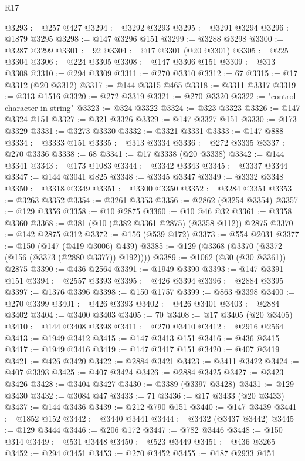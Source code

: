 \begin{lexlean}{R17}
\begin{coremodule}
@3293 := @257 @427
@3294 := @3292 @3293
@3295 := @3291 @3294
@3296 := @1879 @3295
@3298 := @147 @3296 @151
@3299 := @3288 @3298
@3300 := @3287 @3299
@3301 := 92
@3304 := @17 @3301 (@20 @3301)
@3305 := @225 @3304
@3306 := @224 @3305
@3308 := @147 @3306 @151
@3309 := @313 @3308
@3310 := @294 @3309
@3311 := @270 @3310
@3312 := 67
@3315 := @17 @3312 (@20 @3312)
@3317 := @144 @3315 @465
@3318 := @3311 @3317
@3319 := @313 @1516
@3320 := @272 @3319
@3321 := @270 @3320
@3322 := "control character in string"
@3323 := @324 @3322
@3324 := @323 @3323
@3326 := @147 @3324 @151
@3327 := @321 @3326
@3329 := @147 @3327 @151
@3330 := @173 @3329
@3331 := @3273 @3330
@3332 := @3321 @3331
@3333 := @147 @888
@3334 := @3333 @151
@3335 := @313 @3334
@3336 := @272 @3335
@3337 := @270 @3336
@3338 := 68
@3341 := @17 @3338 (@20 @3338)
@3342 := @144 @3341
@3343 := @173 @1083
@3344 := @3342 @3343
@3345 := @3337 @3344
@3347 := @144 @3041 @825
@3348 := @3345 @3347
@3349 := @3332 @3348
@3350 := @3318 @3349
@3351 := @3300 @3350
@3352 := @3284 @3351
@3353 := @3263 @3352
@3354 := @3261 @3353
@3356 := @2862 (@3254 @3354)
@3357 := @129 @3356
@3358 := @10 @2875
@3360 := @10 @46 @32
@3361 := @3358 @3360
@3368 := @381 (@10 (@382 @3361 @2875) (@3358 @112)) @2875
@3370 := @142 @2875 @312
@3372 := @156 (@539 @172)
@3373 := @554 @2031
@3377 := @150 (@147 (@419 @3006) @439)
@3385 := @129 (@3368 (@3370 (@3372 (@156 (@3373 (@2880 @3377)) @192))))
@3389 := @1062 (@30 (@30 @3361)) @2875
@3390 := @436 @2564
@3391 := @1949 @3390
@3393 := @147 @3391 @151
@3394 := @2557 @3393
@3395 := @426 @3394
@3396 := @2884 @3395
@3397 := @1376 @3396
@3398 := @150 @1757
@3399 := @863 @3398
@3400 := @270 @3399
@3401 := @426 @3393
@3402 := @426 @3401
@3403 := @2884 @3402
@3404 := @3400 @3403
@3405 := 70
@3408 := @17 @3405 (@20 @3405)
@3410 := @144 @3408 @3398
@3411 := @270 @3410
@3412 := @2916 @2564
@3413 := @1949 @3412
@3415 := @147 @3413 @151
@3416 := @436 @3415
@3417 := @1949 @3416
@3419 := @147 @3417 @151
@3420 := @407 @3419
@3421 := @426 @3420
@3422 := @2884 @3421
@3423 := @3411 @3422
@3424 := @407 @3393
@3425 := @407 @3424
@3426 := @2884 @3425
@3427 := @3423 @3426
@3428 := @3404 @3427
@3430 := @3389 (@3397 @3428)
@3431 := @129 @3430
@3432 := @3084 @47
@3433 := 71
@3436 := @17 @3433 (@20 @3433)
@3437 := @144 @3436
@3439 := @212 @790 @151
@3440 := @147 @3439
@3441 := @1852 @152
@3442 := @3440 @3441
@3444 := @3432 (@3437 @3442)
@3445 := @129 @3444
@3446 := @206 @172
@3447 := @782 @3446
@3448 := @150 @314
@3449 := @531 @3448
@3450 := @523 @3449
@3451 := @436 @3265
@3452 := @294 @3451
@3453 := @270 @3452
@3455 := @187 @2933 @151

\end{coremodule}
\end{lexlean}
